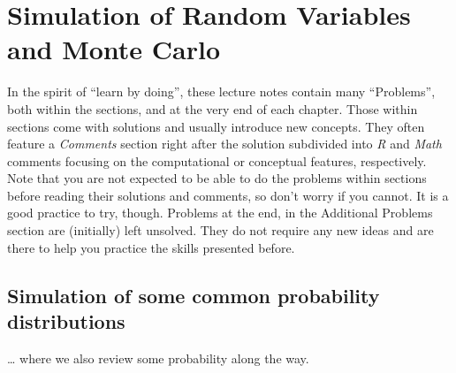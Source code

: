 \documentclass[
]{book}
\theoremstyle{definition}
\theoremstyle{definition}
\theoremstyle{definition}
\theoremstyle{definition}
\theoremstyle{remark}
\begin{document}
\renewcommand{\Pr}{{\mathbf P}}
\newcommand{\upn}[2]{#1^{(#2)}}
\newcommand{\Prup}[1]{\upn{\Pr}{#1}}
\newcommand{\Prz}{\Prup{0}}
\newcommand{\Pro}{\Prup{1}}
\newcommand{\Prn}{\Prup{n}}
\newcommand{\aaa}[1]{{a}^{(#1)}}
\renewcommand{\aa}[1]{{a}^{(#1)}}
\newcommand{\aaz}{\aaa{0}}
\newcommand{\az}{\aa{0}}
\renewcommand{\SS}{\sS}
\newcommand{\pnp}[1]{p^{(#1)}}
\newcommand{\pn}{\pnp{n}}
\newcommand{\tpnp}[1]{\tilde{p}^{(#1)}}
\newcommand{\tpn}{\tpnp{n}}
\newcommand{\fnf}[1]{f^{(#1)}}
\newcommand{\fn}{\fnf{n}}
\newcommand{\tofro}{\leftrightarrow}
\newcommand{\nto}{\not\!\to}
\newcommand{\Vn}{V^{(n)}}

\newcommand{\mat}[1]{\begin{bmatrix}#1\end{bmatrix}}
\newcommand{\pmat}[1]{\begin{bmatrix}#1\end{bmatrix}}

\hypertarget{simulation-of-random-variables-and-monte-carlo}{%
\chapter{Simulation of Random Variables and Monte Carlo}\label{simulation-of-random-variables-and-monte-carlo}}

In the spirit of ``learn by doing'', these lecture notes contain many ``Problems'',
both within the sections, and at the very end of each chapter. Those within
sections come with solutions and usually introduce new concepts. They often
feature a \emph{Comments} section right after the solution subdivided into \emph{R} and
\emph{Math} comments focusing on the computational or conceptual features,
respectively. Note that you are not expected to be able to do the problems
within sections before reading their solutions and comments, so don't worry if
you cannot. It is a good practice to try, though. Problems at the end, in the
Additional Problems section are (initially) left unsolved. They do not require
any new ideas and are there to help you practice the skills presented before.

\hypertarget{simulation-of-some-common-probability-distributions}{%
\section{Simulation of some common probability distributions}\label{simulation-of-some-common-probability-distributions}}

\ldots{} where we also review some probability along the way.
\end{document}
